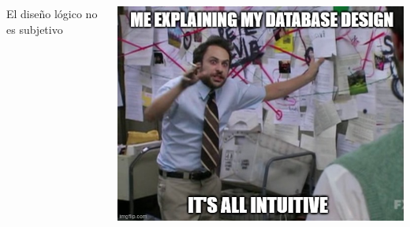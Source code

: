 \begin{frame}{}
    \begin{columns}[T]
        \begin{column}{0.46\linewidth}
            \vspace{33mm}

            \Large \textcolor{blue3}{El dise\~no l\'ogico no es subjetivo}
        \end{column}

        \begin{column}{0.53\linewidth}
            \includegraphics[width=\linewidth, height=0.8\textheight]{img/design.jpg}
        \end{column}
        
    \end{columns}
\end{frame}





